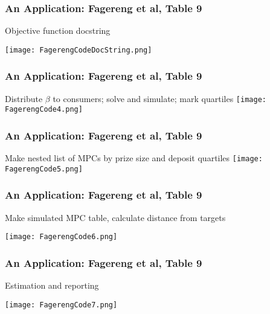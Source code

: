 \documentclass[11ptt]{beamer}
\begin{document}
\begin{frame}
\frametitle{An Application: Fagereng et al, Table 9}

Objective function docstring
\begin{center}
\texttt{[image: FagerengCodeDocString.png]}
\end{center}

\end{frame}



\begin{frame}
\frametitle{An Application: Fagereng et al, Table 9}

Distribute $\beta$ to consumers; solve and simulate; mark quartiles
\texttt{[image: FagerengCode4.png]}

\end{frame}



\begin{frame}
\frametitle{An Application: Fagereng et al, Table 9}

Make nested list of MPCs by prize size and deposit quartiles
\texttt{[image: FagerengCode5.png]}


\end{frame}



\begin{frame}
\frametitle{An Application: Fagereng et al, Table 9}

Make simulated MPC table, calculate distance from targets
\begin{center}
\texttt{[image: FagerengCode6.png]}
\end{center}

\end{frame}



\begin{frame}
\frametitle{An Application: Fagereng et al, Table 9}

Estimation and reporting

\hyperlink{DiscussionTopics}{}

\begin{center}
\texttt{[image: FagerengCode7.png]}
\end{center}

\end{frame}
\end{document}
